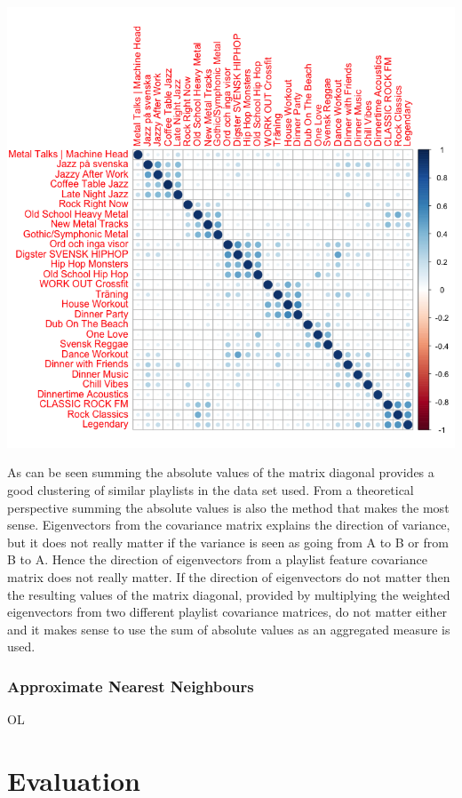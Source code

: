 \documentclass[a4paper,11pt]{kth-mag}
\begin{document}
\includegraphics[scale=0.6]{images/sumAbs.png}

As can be seen summing the absolute values of the matrix diagonal provides a good clustering of similar playlists in the data set used. From a theoretical perspective summing the absolute values is also the method that makes the most sense. Eigenvectors from the covariance matrix explains the direction of variance, but it does not really matter if the variance is seen as going from A to B or from B to A. Hence the direction of eigenvectors from a playlist feature covariance matrix does not really matter. If the direction of eigenvectors do not matter then the resulting values of the matrix diagonal, provided by multiplying the weighted eigenvectors from two different playlist covariance matrices, do not matter either and it makes sense to use the sum of absolute values as an aggregated measure is used.

\section{Approximate Nearest Neighbours}
OL

\part{Evaluation}
\end{document}
